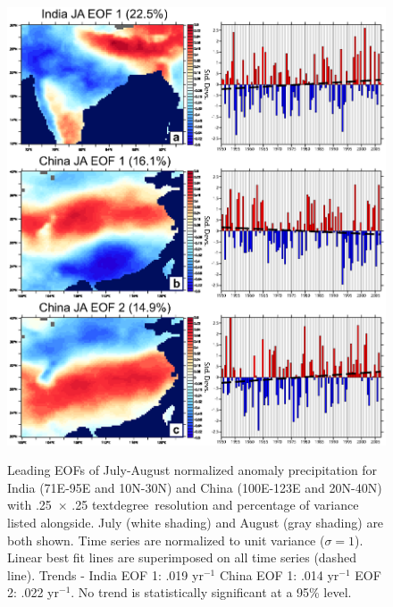 \documentclass[12pt]{article}
\begin{document}
\begin{figure}[t]
  \noindent\includegraphics[width=30pc,angle=0]{fig7eof_region}\\
  \caption{Leading EOFs of July-August normalized anomaly precipitation for India (71E-95E and 10N-30N) and China (100E-123E and 20N-40N) with .25\textdegree\ $\times$ .25
  textdegree\ resolution and percentage of variance listed alongside. July (white shading) and August (gray shading) are both shown. Time series are normalized to unit variance ($\sigma=1$). Linear best fit lines are superimposed on all time series (dashed line). Trends - India EOF 1: .019 yr$^{-1}$ China EOF 1: .014 yr$^{-1}$ EOF 2: .022 yr$^{-1}$. No trend is statistically significant at a 95\% level.}\label{f7}
\end{figure}
\end{document}
